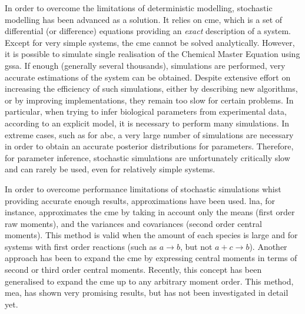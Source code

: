 In order to overcome the limitations of deterministic modelling, stochastic modelling has been advanced as a solution.
It relies on \gls{cme}, which is a set of differential (or difference) equations providing an \emph{exact} description of a system\cite{kampen_stochastic_2011}.
Except for very simple systems, the \gls{cme} cannot be solved analytically.
However, it is possible to simulate single realisation of the Chemical Master Equation using \gls{gssa}.
If enough (generally several thousands), simulations are performed, very accurate estimations of the system can be obtained.
Despite extensive effort on increasing the efficiency of such simulations, either by describing new algorithms, or by improving implementations,
they remain too slow for certain problems.
In particular, when trying to infer biological parameters from experimental data, according to an explicit model,
it is necessary to perform many simulations.
In extreme cases, such as for \gls{abc}\cite{toni_approximate_2009}, a very large number of simulations are necessary in order to obtain an 
accurate posterior distributions for parameters.
Therefore, for parameter inference, stochastic simulations are unfortunately critically slow and can rarely be used, even for relatively simple systems.

In order to overcome performance limitations of stochastic simulations whist providing accurate enough results, approximations have been used.
\Gls{lna}, for instance, approximates the \gls{cme}
by taking in account only the means (first order raw moments), and the variances and covariances (second order central moments)\cite{komorowski_bayesian_2009}.
This method is valid when the amount of each species is large and for systems with first order reactions
(such as  $a \rightarrow b$, but not $a + c  \rightarrow b$).
Another approach has been to expand the \gls{cme} by expressing central moments in terms of second or third order central moments\cite{gillespie_moment-closure_2009, gomez-uribe_mass_2007}.
Recently, this concept has been generalised to expand the \gls{cme} up to any arbitrary moment order\cite{ale_general_2013}.
This method, \gls{mea}, has shown very promising results, but has not been investigated in detail yet.

